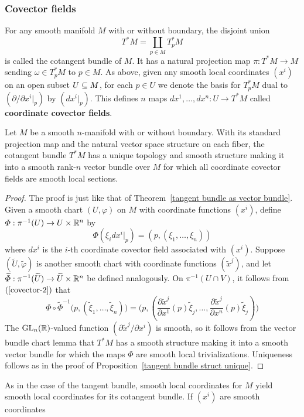 \subsubsection{Covector fields}
For any smooth manifold $M$ with or without boundary, the disjoint union
\[T^*M=\coprod_{p\in M}T^*_pM\]
is called the cotangent bundle of $M$. It has a natural projection map $\pi:T^*M\to M$ sending $\omega\in T^*_pM$ to $p\in M$. As above, given any smooth local coordinates $(x^i)$ on an open subset $U\subseteq M$, for each $p\in U$ we denote the basis for $T^*_pM$ dual to $(\partial/\partial x^i|_p)$ by $(dx^i|_p)$. This defines $n$ maps $dx^1,\dots,dx^n:U\to T^*M$ called \textbf{coordinate covector fields}.
\begin{proposition}
Let $M$ be a smooth $n$-manifold with or without boundary. With its standard projection map and the natural vector space structure on each fiber, the cotangent bundle $T^*M$ has a unique topology and smooth structure making it into a smooth rank-$n$ vector bundle over $M$ for which all coordinate covector fields are smooth local sections.
\end{proposition}
\begin{proof}
The proof is just like that of Theorem~\ref{tangent bundle as vector bundle}. Given a smooth chart $(U,\varphi)$ on $M$ with coordinate functions $(x^i)$, define $\varPhi:\pi^{-1}(U)\to U\times\mathbb{R}^n$ by
\[\varPhi(\xi_idx^i|_p)=(p,(\xi_1,\dots,\xi_n))\]
where $dx^i$ is the $i$-th coordinate covector field associated with $(x^i)$. Suppose $(\widetilde{U},\widetilde{\varphi})$ is another smooth chart with coordinate functions $(\widetilde{x}^j)$, and let $\widetilde{\varPhi}:\pi^{-1}(\widetilde{U})\to\widetilde{U}\times\mathbb{R}^n$ be defined analogously. On $\pi^{-1}(U\cap V)$, it follows from $(\ref{covector-2})$ that
\[\varPhi\circ\widetilde{\varPhi}^{-1}\big(p,(\widetilde{\xi}_1,\dots,\widetilde{\xi}_n)\big)=\big(p,(\frac{\partial\widetilde{x}^j}{\partial x^1}(p)\widetilde{\xi}_j,\dots,\frac{\partial\widetilde{x}^j}{\partial x^n}(p)\widetilde{\xi}_j)\big)\]
The $\mathrm{GL}_n(\mathbb{R})$-valued function $(\partial\widetilde{x}^j/\partial x^i)$ is smooth, so it follows from the vector bundle chart lemma that $T^*M$ has a smooth structure making it into a smooth vector bundle for which the maps $\varPhi$ are smooth local trivializations. Uniqueness follows as in the proof of Proposition~\ref{tangent bundle struct unique}.
\end{proof}
As in the case of the tangent bundle, smooth local coordinates for $M$ yield smooth local coordinates for its cotangent bundle. If $(x^i)$ are smooth coordinates
